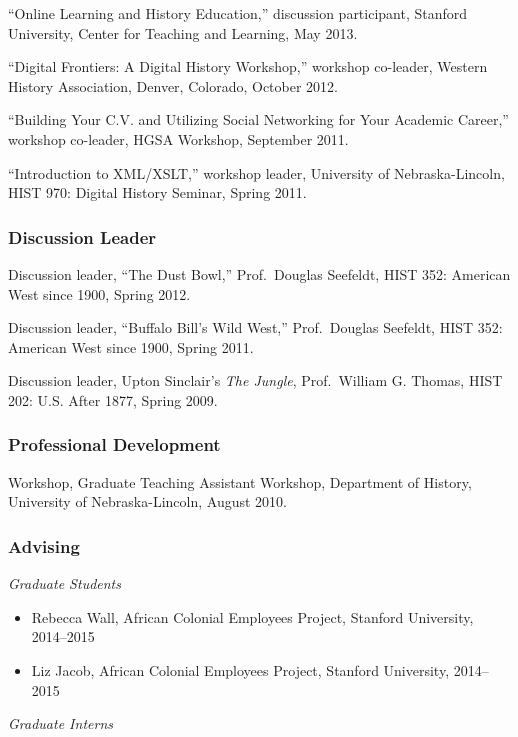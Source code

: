 ``Online Learning and History Education,'' discussion participant,
Stanford University, Center for Teaching and Learning, May 2013.

``Digital Frontiers: A Digital History Workshop,'' workshop co-leader,
Western History Association, Denver, Colorado, October 2012.

``Building Your C.V. and Utilizing Social Networking for Your Academic
Career,'' workshop co-leader, HGSA Workshop, September 2011.

``Introduction to XML/XSLT,'' workshop leader, University of
Nebraska-Lincoln, HIST 970: Digital History Seminar, Spring 2011.

\subsubsection{Discussion Leader}\label{discussion-leader}

Discussion leader, ``The Dust Bowl,'' Prof.~Douglas Seefeldt, HIST 352:
American West since 1900, Spring 2012.

Discussion leader, ``Buffalo Bill's Wild West,'' Prof.~Douglas Seefeldt,
HIST 352: American West since 1900, Spring 2011.

Discussion leader, Upton Sinclair's \emph{The Jungle}, Prof.~William G.
Thomas, HIST 202: U.S. After 1877, Spring 2009.

\subsubsection{Professional
Development}\label{professional-development-1}

Workshop, Graduate Teaching Assistant Workshop, Department of History,
University of Nebraska-Lincoln, August 2010.

\subsubsection{Advising}\label{advising}

\emph{Graduate Students}

\begin{itemize}
\tightlist
\item
  Rebecca Wall, African Colonial Employees Project, Stanford University,
  2014--2015
\item
  Liz Jacob, African Colonial Employees Project, Stanford University,
  2014--2015
\end{itemize}

\emph{Graduate Interns}

